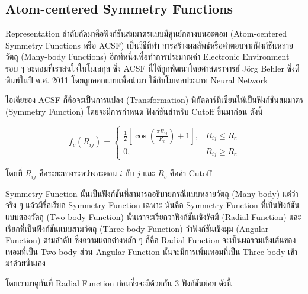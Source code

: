 \subsection{Atom-centered Symmetry Functions}
\label{ssec:acsf}

Representation ลำดับถัดมาคือฟังก์ชันสมมาตรแบบมีศูนย์กลางบนอะตอม (Atom-centered Symmetry Functions หรือ ACSF) เป็นวิธีที่ทำ%
การสร้างผลลัพธ์หรือคำตอบจากฟังก์ชันหลายวัตถุ (Many-body Functions) อีกทีหนึ่งเพื่อทำการประมาณค่า Electronic Environment รอบ ๆ
อะตอมที่เราสนใจในโมเลกุล ซึ่ง ACSF นี้ได้ถูกพัฒนาโดยศาสตราจารย์ J\"{o}rg Behler ซึ่งตีพิมพ์ในปี ค.ศ. 2011 โดยถูกออกแบบเพื่อนำมา%
ใช้กับโมเดลประเภท Neural Network \autocite{behler2011a}

ไอเดียของ ACSF ก็คือจะเป็นการแปลง (Transformation) พิกัดคาร์ทีเซียนให้เป็นฟังก์ชันสมมาตร (Symmetry Function) โดยจะมีการกำหนด%
ฟังก์ชันสำหรับ Cutoff ขึ้นมาก่อน ดังนี้

\begin{equation}\label{eq:acsf_cutoff}
    f_{c}(R_{ij}) =
    \begin{cases}
        \frac{1}{2} \left[\cos(\frac{\textstyle \pi R_{ij}}{\textstyle R_{c}}) + 1 \right], & R_{ij} \le R_{c} \\
        0,                                                                                  & R_{ij} \ge R_{c}
    \end{cases}
\end{equation}

\noindent โดยที่ $R_{ij}$ คือระยะห่างระหว่างอะตอม $i$ กับ $j$ และ $R_{c}$ คือค่า Cutoff

Symmetry Function นั้นเป็นฟังก์ชันที่สามารถอธิบายกรณีแบบหลายวัตถุ (Many-body) แต่ว่าจริง ๆ แล้วมีชื่อเรียก Symmetry Function เฉพาะ
นั่นคือ Symmetry Function ที่เป็นฟังก์ชันแบบสองวัตถุ (Two-body Function) นั้นเราจะเรียกว่าฟังก์ชันเชิงรัศมี (Radial Function)
และเรียกที่เป็นฟังก์ชันแบบสามวัตถุ (Three-body Function) ว่าฟังก์ชันเชิงมุม (Angular Function) ตามลำดับ ซึ่งความแตกต่างหลัก ๆ
ก็คือ Radial Function จะเป็นผลรวมเชิงเส้นของเทอมที่เป็น Two-body ส่วน Angular Function นั้นจะมีการเพิ่มเทอมที่เป็น Three-body
เข้ามาด้วยนั่นเอง

โดยเรามาดูกันที่ Radial Function ก่อนซึ่งจะมีด้วยกัน 3 ฟังก์ชันย่อย ดังนี้

